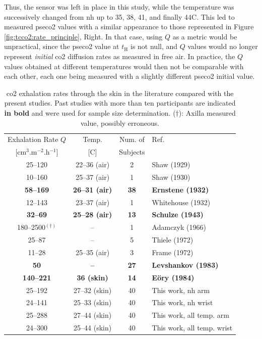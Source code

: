 Thus, the sensor was left in place in this study, while the temperature was successively changed from \gls{nh} up to 35, 38, 41, and finally 44{\degree}C. This led to measured \gls{pseco2} values with a similar appearance to those represented in Figure \ref{fig:tcco2:rate_principle}, Right. In that case, using $Q$ as a metric would be unpractical, since the \gls{pseco2} value at $t_\text{H}$ is not null, and $Q$ values would no longer represent \emph{initial} \gls{co2} diffusion rates as measured in free air. In practice, the $Q$ values obtained at different temperatures would then not be comparable with each other, each one being measured with a slightly different \gls{pseco2} initial value.

\def\arraystretch{1.25}
\begin{table}
	\centering
	\begin{tabular}{c|c|c|l}
		Exhalation Rate $Q$ & Temp. & Num. of & Ref. \\
		{[}cm$^{3}$.m$^{-2}$.h$^{-1}$] & [{\degree}C] & Subjects & \\ \hhline{=|=|=|=}
		25--120 		& 22--36 (air)	& 2 & Shaw (1929)\cite{shaw1929} \\ \hline
		10--160 		& 25--37 (air)	 & 1 & Shaw (1930)\cite{shaw1930} \\ \hline
		\textbf{58--169}			& \textbf{26--31 (air)}	& \textbf{38} & \textbf{Ernstene (1932)\cite[Table~1]{ernstene1932a}} \\ \hline
		12--143			& 23--37 (air)		& 1	& Whitehouse (1932)\cite{whitehouse1932} \\ \hline
		\textbf{32--69} & \textbf{25--28 (air)} & \textbf{13} & \textbf{Schulze (1943)\cite[Table~12]{schulze1943}} \\ \hline
		180--2500$^{(\dagger)}$	& -- 	 & 1 & Adamczyk (1966)\cite{adamczyk1966} \\ \hline
		25--87			& -- 				 & 5 & Thiele (1972)\cite{thiele1972} \\ \hline
		11--28 & 25--35 (air) & 3 & Frame (1972)\cite{frame1972} \\ \hline 
		\textbf{50} & \textbf{--} & \textbf{27} & \textbf{Levshankov (1983)\cite{levshankov1983}} \\ \hline
		\textbf{140--221} & \textbf{36 (skin)} & \textbf{14} & \textbf{E{\"o}ry (1984)\cite{eory1984}} \\ \hhline{=|=|=|=}
		25--192 & 27--32 (skin) & 40 & This work, \gls{nh} arm \\ \hline
		24--141 & 25--33 (skin) & 40 & This work, \gls{nh} wrist \\ \hline
		25--288 & 27--44 (skin) & 40 & This work, all temp. arm \\ \hline
		24--300 & 25--44 (skin) & 40 & This work, all temp. wrist
	\end{tabular}	
	\caption[\gls{co2} exhalation rates through the skin in the literature.]{\gls{co2} exhalation rates through the skin in the literature compared with the present studies. Past studies with more than ten participants are indicated \textbf{in bold} and were used for sample size determination. ($\dagger$): Axilla measured value, possibly erroneous.}\label{table:tcco2:diff_rate_lit}
\end{table}

